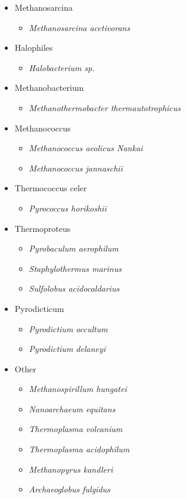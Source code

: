 \documentclass[10pt,letterpaper]{article}
\begin{document}
\begin{itemize}
	\item Methanosarcina
	\begin{itemize}
		\item \textit{Methanosarcina acetivorans}
	\end{itemize}
	\item Halophiles
	\begin{itemize}
		\item \textit{Halobacterium sp.}
	\end{itemize}
	\item Methanobacterium
	\begin{itemize}
		\item \textit{Methanothermobacter thermautotrophicus}
	\end{itemize}
	\item Methanococcus
	\begin{itemize}
		\item \textit{Methanococcus aeolicus Nankai}
		\item \textit{Methanococcus jannaschii}
	\end{itemize}
	\item Thermococcus celer
	\begin{itemize}
		\item \textit{Pyrococcus horikoshii}
	\end{itemize}
	\item Thermoproteus
	\begin{itemize}
		\item \textit{Pyrobaculum aerophilum}
		\item \textit{Staphylothermus marinus}
		\item \textit{Sulfolobus acidocaldarius}
	\end{itemize}
	\item Pyrodicticum
	\begin{itemize}
		\item \textit{Pyrodictium occultum}
		\item \textit{Pyrodictium delaneyi}
	\end{itemize}
	\item Other
	\begin{itemize}
		\item \textit{Methanospirillum hungatei}
		\item \textit{Nanoarchaeum equitans}
		\item \textit{Thermoplasma volcanium}
		\item \textit{Thermoplasma acidophilum}
		\item \textit{Methanopyrus kandleri}
		\item \textit{Archaeoglobus fulgidus}
	\end{itemize}
\end{itemize}
\end{document}

